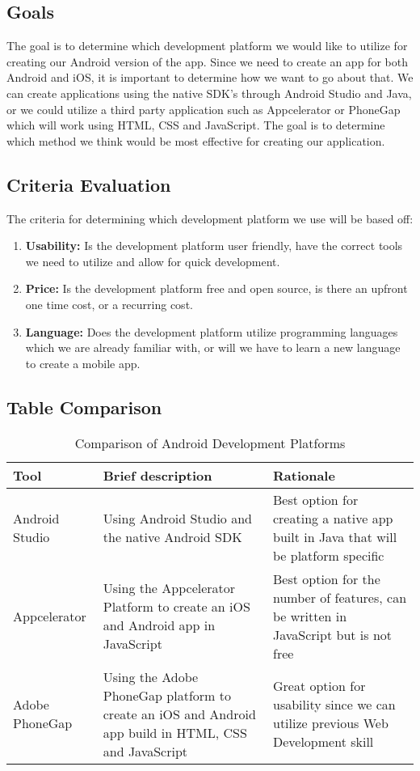 \documentclass[letterpaper,10pt,draftclsnofoot,onecolumn,titlepage]{IEEEtran}
\begin{document}
		\subsection{Goals}
			The goal is to determine which development platform we would like to utilize for creating our Android version of the app.
			Since we need to create an app for both Android and iOS, it is important to determine how we want to go about that.
			We can create applications using the native SDK's through Android Studio and Java, or we could utilize a third party application such as Appcelerator or PhoneGap which will work using HTML, CSS and JavaScript.
			The goal is to determine which method we think would be most effective for creating our application.

		\subsection{Criteria Evaluation}
			The criteria for determining which development platform we use will be based off:
			\begin{enumerate}
				\item \textbf{Usability:} Is the development platform user friendly, have the correct tools we need to utilize and allow for quick development.
				\item \textbf{Price:} Is the development platform free and open source, is there an upfront one time cost, or a recurring cost.
				\item \textbf{Language:} Does the development platform utilize programming languages which we are already familiar with, or will we have to learn a new language to create a mobile app.
			\end{enumerate}

		\subsection{Table Comparison}
		\begin{table}[ht]
			\caption{Comparison of Android Development Platforms}
			\begin{center}
				\begin{tabular} { | m{3cm} | m{5cm} | m{5cm} | }
					\hline\hline
					Tool & Brief description & Rationale \\ [0.5ex]
					\hline
					Android Studio & Using Android Studio and the native Android SDK & Best option for creating a native app built in Java that will be platform specific \\
					\hline
					Appcelerator & Using the Appcelerator Platform to create an iOS and Android app in JavaScript & Best option for the number of features, can be written in JavaScript but is not free\\
					\hline
					Adobe PhoneGap & Using the Adobe PhoneGap platform to create an iOS and Android app build in HTML, CSS and JavaScript & Great option for usability since we can utilize previous Web Development skill \\
					\hline
				\end{tabular}
			\end{center}
		\end{table}
\end{document}
